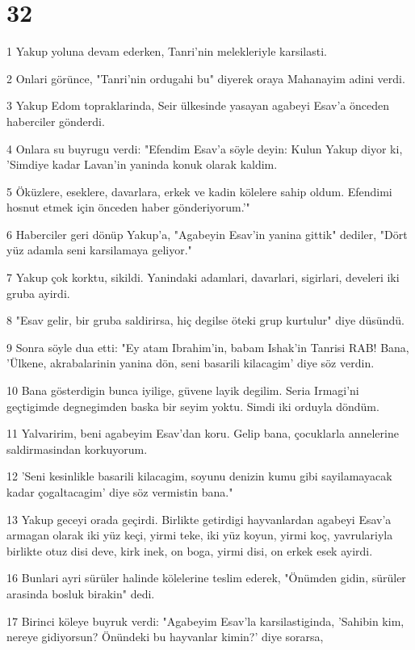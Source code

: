 \chapter{32}

\par 1 Yakup yoluna devam ederken, Tanri'nin melekleriyle karsilasti.
\par 2 Onlari görünce, "Tanri'nin ordugahi bu" diyerek oraya Mahanayim adini verdi.
\par 3 Yakup Edom topraklarinda, Seir ülkesinde yasayan agabeyi Esav'a önceden haberciler gönderdi.
\par 4 Onlara su buyrugu verdi: "Efendim Esav'a söyle deyin: Kulun Yakup diyor ki, 'Simdiye kadar Lavan'in yaninda konuk olarak kaldim.
\par 5 Öküzlere, eseklere, davarlara, erkek ve kadin kölelere sahip oldum. Efendimi hosnut etmek için önceden haber gönderiyorum.'"
\par 6 Haberciler geri dönüp Yakup'a, "Agabeyin Esav'in yanina gittik" dediler, "Dört yüz adamla seni karsilamaya geliyor."
\par 7 Yakup çok korktu, sikildi. Yanindaki adamlari, davarlari, sigirlari, develeri iki gruba ayirdi.
\par 8 "Esav gelir, bir gruba saldirirsa, hiç degilse öteki grup kurtulur" diye düsündü.
\par 9 Sonra söyle dua etti: "Ey atam Ibrahim'in, babam Ishak'in Tanrisi RAB! Bana, 'Ülkene, akrabalarinin yanina dön, seni basarili kilacagim' diye söz verdin.
\par 10 Bana gösterdigin bunca iyilige, güvene layik degilim. Seria Irmagi'ni geçtigimde degnegimden baska bir seyim yoktu. Simdi iki orduyla döndüm.
\par 11 Yalvaririm, beni agabeyim Esav'dan koru. Gelip bana, çocuklarla annelerine saldirmasindan korkuyorum.
\par 12 'Seni kesinlikle basarili kilacagim, soyunu denizin kumu gibi sayilamayacak kadar çogaltacagim' diye söz vermistin bana."
\par 13 Yakup geceyi orada geçirdi. Birlikte getirdigi hayvanlardan agabeyi Esav'a armagan olarak iki yüz keçi, yirmi teke, iki yüz koyun, yirmi koç, yavrulariyla birlikte otuz disi deve, kirk inek, on boga, yirmi disi, on erkek esek ayirdi.
\par 16 Bunlari ayri sürüler halinde kölelerine teslim ederek, "Önümden gidin, sürüler arasinda bosluk birakin" dedi.
\par 17 Birinci köleye buyruk verdi: "Agabeyim Esav'la karsilastiginda, 'Sahibin kim, nereye gidiyorsun? Önündeki bu hayvanlar kimin?' diye sorarsa,

